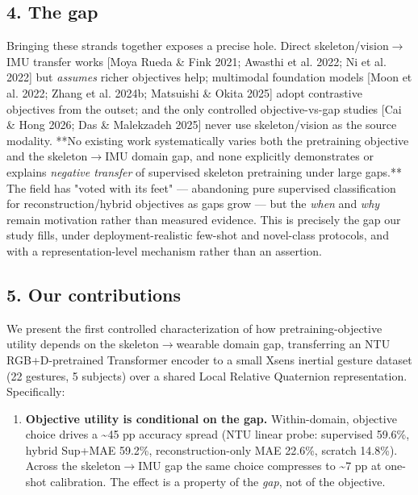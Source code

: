 \subsection{4. The gap}

Bringing these strands together exposes a precise hole. Direct skeleton/vision$\rightarrow$IMU transfer works [Moya Rueda \& Fink 2021; Awasthi et al. 2022; Ni et al. 2022] but \textit{assumes} richer objectives help; multimodal foundation models [Moon et al. 2022; Zhang et al. 2024b; Matsuishi \& Okita 2025] adopt contrastive objectives from the outset; and the only controlled objective-vs-gap studies [Cai \& Hong 2026; Das \& Malekzadeh 2025] never use skeleton/vision as the source modality. **No existing work systematically varies both the pretraining objective and the skeleton$\rightarrow$IMU domain gap, and none explicitly demonstrates or explains \textit{negative transfer} of supervised skeleton pretraining under large gaps.** The field has "voted with its feet" --- abandoning pure supervised classification for reconstruction/hybrid objectives as gaps grow --- but the \textit{when} and \textit{why} remain motivation rather than measured evidence. This is precisely the gap our study fills, under deployment-realistic few-shot and novel-class protocols, and with a representation-level mechanism rather than an assertion.

\subsection{5. Our contributions}

We present the first controlled characterization of how pretraining-objective utility depends on the skeleton$\rightarrow$wearable domain gap, transferring an NTU RGB+D-pretrained Transformer encoder to a small Xsens inertial gesture dataset (22 gestures, 5 subjects) over a shared Local Relative Quaternion representation. Specifically:

\begin{enumerate}
  \item \textbf{Objective utility is conditional on the gap.} Within-domain, objective choice drives a \textasciitilde{}45 pp accuracy spread (NTU linear probe: supervised 59.6\%, hybrid Sup+MAE 59.2\%, reconstruction-only MAE 22.6\%, scratch 14.8\%). Across the skeleton$\rightarrow$IMU gap the same choice compresses to \textasciitilde{}7 pp at one-shot calibration. The effect is a property of the \textit{gap}, not of the objective.
\end{enumerate}

